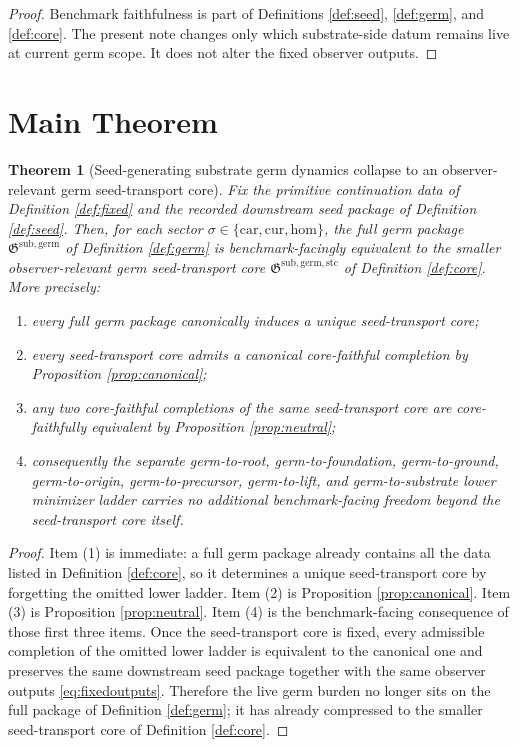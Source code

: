 \documentclass[11pt]{article}
\newcommand{\Car}{\mathrm{car}}
\newcommand{\Cur}{\mathrm{cur}}
\newcommand{\Hom}{\mathrm{hom}}
\newcommand{\GermPackage}{\mathfrak G^{\mathrm{sub,germ}}}
\newcommand{\GermTransportCore}{\mathfrak G^{\mathrm{sub,germ,stc}}}
\newtheorem{theorem}{Theorem}
\begin{document}
\begin{proof}
Benchmark faithfulness is part of Definitions \ref{def:seed}, \ref{def:germ}, and \ref{def:core}. The present note changes only which substrate-side datum remains live at current germ scope. It does not alter the fixed observer outputs.
\end{proof}

\section{Main Theorem}

\begin{theorem}[Seed-generating substrate germ dynamics collapse to an observer-relevant germ seed-transport core]
\label{thm:main}
Fix the primitive continuation data of Definition \ref{def:fixed} and the recorded downstream seed package of Definition \ref{def:seed}. Then, for each sector \(\sigma\in\{\Car,\Cur,\Hom\}\), the full germ package \(\GermPackage\) of Definition \ref{def:germ} is benchmark-facingly equivalent to the smaller observer-relevant germ seed-transport core \(\GermTransportCore\) of Definition \ref{def:core}. More precisely:
\begin{enumerate}
    \item every full germ package canonically induces a unique seed-transport core;
    \item every seed-transport core admits a canonical core-faithful completion by Proposition \ref{prop:canonical};
    \item any two core-faithful completions of the same seed-transport core are core-faithfully equivalent by Proposition \ref{prop:neutral};
    \item consequently the separate germ-to-root, germ-to-foundation, germ-to-ground, germ-to-origin, germ-to-precursor, germ-to-lift, and germ-to-substrate lower minimizer ladder carries no additional benchmark-facing freedom beyond the seed-transport core itself.
\end{enumerate}
\end{theorem}

\begin{proof}
Item (1) is immediate: a full germ package already contains all the data listed in Definition \ref{def:core}, so it determines a unique seed-transport core by forgetting the omitted lower ladder. Item (2) is Proposition \ref{prop:canonical}. Item (3) is Proposition \ref{prop:neutral}. Item (4) is the benchmark-facing consequence of those first three items. Once the seed-transport core is fixed, every admissible completion of the omitted lower ladder is equivalent to the canonical one and preserves the same downstream seed package together with the same observer outputs \eqref{eq:fixedoutputs}. Therefore the live germ burden no longer sits on the full package of Definition \ref{def:germ}; it has already compressed to the smaller seed-transport core of Definition \ref{def:core}.
\end{proof}
\end{document}
